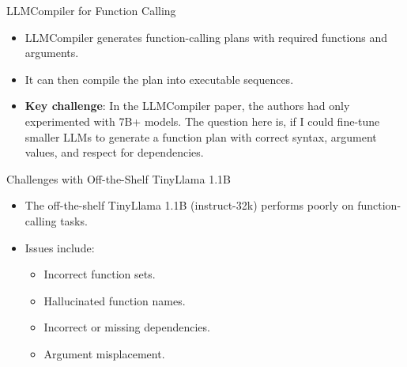 \documentclass{beamer}
\begin{document}
\begin{frame}{LLMCompiler for Function Calling}
    \begin{itemize}
        \item LLMCompiler \citep{kim2023llmcompiler} generates function-calling plans with required functions and arguments.
        \item It can then compile the plan into executable sequences.
        \item \textbf{Key challenge}: In the LLMCompiler paper, the authors had only experimented with 7B+ models. The question here is, if I could fine-tune smaller LLMs to generate a function plan with correct syntax, argument values, and respect for dependencies.
    \end{itemize}
\end{frame}

\begin{frame}{Challenges with Off-the-Shelf TinyLlama 1.1B}
    \begin{itemize}
        \item The off-the-shelf TinyLlama 1.1B (instruct-32k) performs poorly on function-calling tasks.
        \item Issues include:
        \begin{itemize}
            \item Incorrect function sets.
            \item Hallucinated function names.
            \item Incorrect or missing dependencies.
            \item Argument misplacement.
        \end{itemize}
    \end{itemize}
\end{frame}
\end{document}
